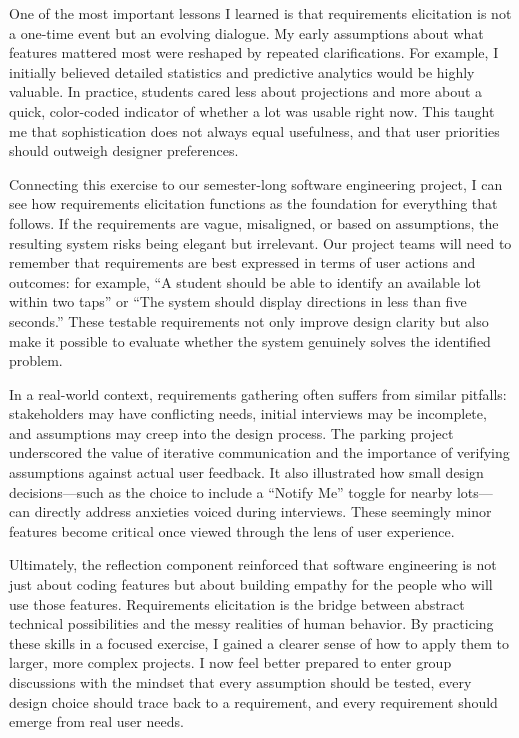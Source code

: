 \documentclass[12pt]{article}
\begin{document}
One of the most important lessons I learned is that requirements elicitation is not a one-time event but an evolving dialogue. My early assumptions about what features mattered most were reshaped by repeated clarifications. For example, I initially believed detailed statistics and predictive analytics would be highly valuable. In practice, students cared less about projections and more about a quick, color-coded indicator of whether a lot was usable right now. This taught me that sophistication does not always equal usefulness, and that user priorities should outweigh designer preferences.

Connecting this exercise to our semester-long software engineering project, I can see how requirements elicitation functions as the foundation for everything that follows. If the requirements are vague, misaligned, or based on assumptions, the resulting system risks being elegant but irrelevant. Our project teams will need to remember that requirements are best expressed in terms of user actions and outcomes: for example, “A student should be able to identify an available lot within two taps” or “The system should display directions in less than five seconds.” These testable requirements not only improve design clarity but also make it possible to evaluate whether the system genuinely solves the identified problem.

In a real-world context, requirements gathering often suffers from similar pitfalls: stakeholders may have conflicting needs, initial interviews may be incomplete, and assumptions may creep into the design process. The parking project underscored the value of iterative communication and the importance of verifying assumptions against actual user feedback. It also illustrated how small design decisions—such as the choice to include a “Notify Me” toggle for nearby lots—can directly address anxieties voiced during interviews. These seemingly minor features become critical once viewed through the lens of user experience.

Ultimately, the reflection component reinforced that software engineering is not just about coding features but about building empathy for the people who will use those features. Requirements elicitation is the bridge between abstract technical possibilities and the messy realities of human behavior. By practicing these skills in a focused exercise, I gained a clearer sense of how to apply them to larger, more complex projects. I now feel better prepared to enter group discussions with the mindset that every assumption should be tested, every design choice should trace back to a requirement, and every requirement should emerge from real user needs.
\end{document}
